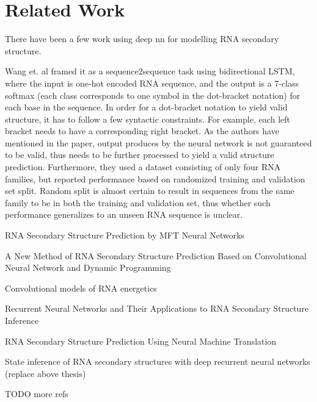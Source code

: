 \documentclass{article}
\begin{document}

\section{Related Work}

There have been a few work using deep nn for modelling RNA secondary structure.

Wang et. al\cite{wang2019dmfold} framed it as a sequence2sequence task using bidirectional LSTM,
where the input is one-hot encoded RNA sequence, and the output is a
7-class softmax (each class corresponds to one symbol in the dot-bracket notation) for each base in the sequence.
In order for a dot-bracket notation to yield valid structure, it has to follow a few syntactic constraints.
For example, each left bracket needs to have a corresponding right bracket.
As the authors have mentioned in the paper, output produces by the neural network
is not guaranteed to be valid, thus needs to be further processed to yield a valid structure prediction.
Furthermore, they used a dataset consisting of only four RNA families,
but reported performance based on randomized training and validation set split.
Random split is almost certain to result in sequences from the same family to be in both the training and validation set,
thus whether such performance generalizes to an unseen RNA sequence is unclear.

﻿RNA Secondary Structure Prediction by MFT Neural Networks

﻿A New Method of RNA Secondary Structure Prediction Based on Convolutional Neural Network and Dynamic Programming

﻿Convolutional models of RNA energetics

﻿Recurrent Neural Networks and Their Applications to RNA Secondary Structure Inference

﻿RNA Secondary Structure Prediction Using Neural Machine Translation

﻿State inference of RNA secondary structures with deep recurrent neural networks  (replace above thesis)

TODO more refs


%
%
%
%
\end{document}
